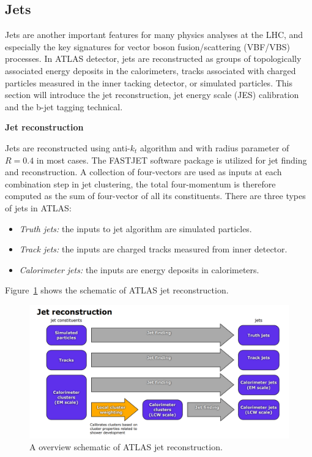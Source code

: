 \subsection{Jets}
\label{sec:jet}

Jets are another important features for many physics analyses at the LHC, and especially the key signatures for vector boson fusion/scattering (VBF/VBS) processes.
In ATLAS detector, jets are reconstructed as groups of topologically associated energy deposits in the calorimeters, 
tracks associated with charged particles measured in the inner tacking detector, or simulated particles.
This section will introduce the jet reconstruction, jet energy scale (JES) calibration and the b-jet tagging technical.

\textbf{Jet reconstruction}

Jets are reconstructed using anti-$k_{t}$ algorithm\cite{Cacciari_2008} and with radius parameter of $R = 0.4$ in most cases.
The FASTJET software package\cite{Cacciari2012} is utilized for jet finding and reconstruction.
A collection of four-vectors are used as inputs at each combination step in jet clustering, 
the total four-momentum is therefore computed as the sum of four-vector of all its constituents.
There are three types of jets in ATLAS:
\begin{itemize}
	\item \textit{Truth jets:} the inputs to jet algorithm are simulated particles.
	\item \textit{Track jets:} the inputs are charged tracks measured from inner detector.
	\item \textit{Calorimeter jets:} the inputs are energy deposits in calorimeters.
\end{itemize}
Figure~\ref{fig:jet_reco_overview} shows the schematic of ATLAS jet reconstruction.
\begin{figure}[!htb]
  \centering
  \includegraphics[width=1.0\textwidth]{figures/Simulation/threetypes_jet_reco.png}
  \caption{A overview schematic of ATLAS jet reconstruction\cite{Aad:2014bia}.}
  \label{fig:jet_reco_overview}
\end{figure}

